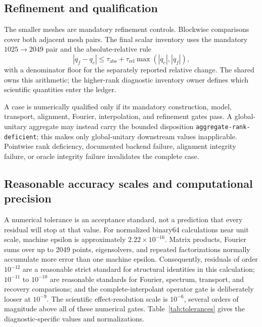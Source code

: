 \documentclass[11pt]{article}
\begin{document}
\subsection{Refinement and qualification}

The smaller meshes are mandatory refinement controls. Blockwise comparisons cover both
adjacent mesh pairs. The final scalar inventory uses the mandatory
$1025\rightarrow2049$ pair and the absolute-relative rule
\begin{equation}
 |q_f-q_c|\leq\tau_{\mathrm{abs}}+\tau_{\mathrm{rel}}
 \max(|q_c|,|q_f|),
 \label{eq:refinement-rule}
\end{equation}
with a denominator floor for the separately reported relative change. The shared
 owns this arithmetic; the higher-rank diagnostic
inventory owner defines which scientific quantities enter the ledger.

A case is numerically qualified only if its mandatory construction, model, transport,
alignment, Fourier, interpolation, and refinement gates pass. A global-unitary
aggregate may instead carry the bounded disposition
\texttt{aggregate-rank-deficient}; this makes only global-unitary downstream values
inapplicable. Pointwise rank deficiency, documented backend failure, alignment integrity
failure, or oracle integrity failure invalidates the complete case.

\subsection{Reasonable accuracy scales and computational precision}

A numerical tolerance is an acceptance standard, not a prediction that every residual
will stop at that value. For normalized binary64 calculations near unit scale, machine
epsilon is approximately $2.22\times10^{-16}$. Matrix products, Fourier sums over up to
2049 points, eigensolvers, and repeated factorizations normally accumulate more error
than one machine epsilon. Consequently, residuals of order $10^{-12}$ are a reasonable
strict standard for structural identities in this calculation; $10^{-11}$ to $10^{-10}$
are reasonable standards for Fourier, spectrum, transport, and recovery comparisons;
and the complete-interpolant operator gate is deliberately looser at $10^{-9}$. The
scientific effect-resolution scale is $10^{-6}$, several orders of magnitude above all
of these numerical gates. Table~\ref{tab:tolerances} gives the diagnostic-specific
values and normalizations.
\end{document}
